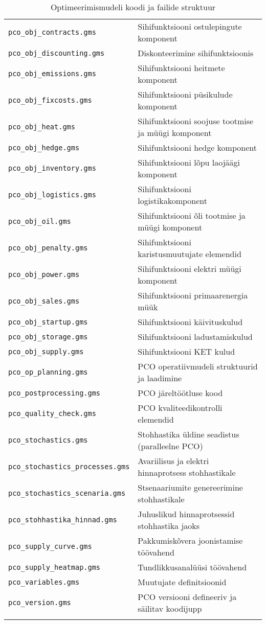 \begin{longtable}{l l}
\texttt{pco\_obj\_contracts.gms} & Sihifunktsiooni ostulepingute komponent\\
\texttt{pco\_obj\_discounting.gms} & Diskonteerimine sihifunktsioonis \\
\texttt{pco\_obj\_emissions.gms} & Sihifunktsiooni heitmete komponent\\
\texttt{pco\_obj\_fixcosts.gms} & Sihifunktsiooni püsikulude komponent\\
\texttt{pco\_obj\_heat.gms} & Sihifunktsiooni soojuse tootmise ja müügi komponent\\
\texttt{pco\_obj\_hedge.gms} & Sihifunktsiooni hedge komponent\\
\texttt{pco\_obj\_inventory.gms} & Sihifunktsiooni lõpu laojäägi komponent\\
\texttt{pco\_obj\_logistics.gms} & Sihifunktsiooni logistikakomponent\\
\texttt{pco\_obj\_oil.gms} & Sihifunktsiooni õli tootmise ja müügi komponent\\
\texttt{pco\_obj\_penalty.gms} & Sihifunktsiooni karistusmuutujate elemendid\\
\texttt{pco\_obj\_power.gms} & Sihifunktsiooni elektri müügi komponent\\
\texttt{pco\_obj\_sales.gms} & Sihifunktsiooni primaarenergia müük\\
\texttt{pco\_obj\_startup.gms} & Sihifunktsiooni käivituskulud\\
\texttt{pco\_obj\_storage.gms} & Sihifunktsiooni ladustamiskulud\\
\texttt{pco\_obj\_supply.gms} & Sihifunktsiooni KET kulud\\
\texttt{pco\_op\_planning.gms} & PCO operatiivmudeli struktuurid ja laadimine\\
\texttt{pco\_postprocessing.gms} & PCO järeltöötluse kood\\
\texttt{pco\_quality\_check.gms} & PCO kvaliteedikontrolli elemendid\\
\texttt{pco\_stochastics.gms} & Stohhastika üldine seadistus (paralleelne PCO)\\
\texttt{pco\_stochastics\_processes.gms} & Avariilisus ja elektri hinnaprotsess stohhastikale\\
\texttt{pco\_stochastics\_scenaria.gms} & Stsenaariumite genereerimine stohhastikale\\
\texttt{pco\_stohhastika\_hinnad.gms} & Juhuslikud hinnaprotsessid stohhastika jaoks\\
\texttt{pco\_supply\_curve.gms} & Pakkumiskõvera joonistamise töövahend\\
\texttt{pco\_supply\_heatmap.gms} & Tundlikkusanalüüsi töövahend\\
\texttt{pco\_variables.gms} & Muutujate definitsioonid\\
\texttt{pco\_version.gms} & PCO versiooni defineeriv ja säilitav koodijupp\\
\caption{Optimeerimismudeli koodi ja failide struktuur\label{tab:struktuur}}
\end{longtable}
